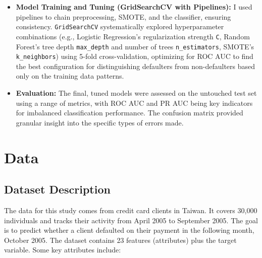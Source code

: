 \documentclass[a4paper,12pt]{article}
\begin{document}
\begin{itemize}
  \item \textbf{Model Training and Tuning (GridSearchCV with Pipelines):} I used pipelines to chain preprocessing, SMOTE, and the classifier, ensuring consistency. \texttt{GridSearchCV} systematically explored hyperparameter combinations (e.g., Logistic Regression's regularization strength \texttt{C}, Random Forest's tree depth \texttt{max\_depth} and number of trees \texttt{n\_estimators}, SMOTE's \texttt{k\_neighbors}) using 5-fold cross-validation, optimizing for ROC AUC to find the best configuration for distinguishing defaulters from non-defaulters based only on the training data patterns.

  \item \textbf{Evaluation:} The final, tuned models were assessed on the untouched test set using a range of metrics, with ROC AUC and PR AUC being key indicators for imbalanced classification performance. The confusion matrix provided granular insight into the specific types of errors made.
\end{itemize}


\section{Data}

\subsection{Dataset Description}

The data for this study comes from credit card clients in Taiwan. It covers 30,000 individuals and tracks their activity from April 2005 to September 2005. The goal is to predict whether a client defaulted on their payment in the following month, October 2005. The dataset contains 23 features (attributes) plus the target variable. Some key attributes include:
\end{document}
